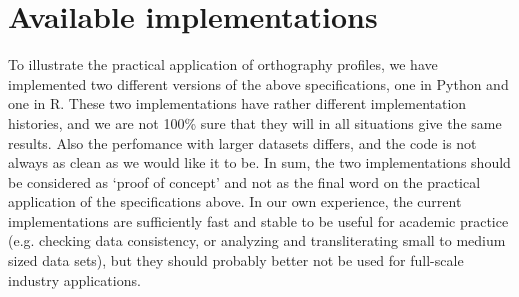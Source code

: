 \documentclass[output=inprep,
		biblatex
		]{LSP/langsci}\usepackage[]{graphicx}\usepackage[]{color}
\begin{document}
\maketitle
\frontmatter
% 
% 
% 
\tableofcontents
\mainmatter%














\section{Available implementations}
\label{implementations}

To illustrate the practical application of orthography profiles, we have
implemented two different versions of the above specifications, one in Python
and one in R. These two implementations have rather different implementation
histories, and we are not 100\% sure that they will in all situations give the
same results. Also the perfomance with larger datasets differs, and the code is
not always as clean as we would like it to be. In sum, the two implementations
should be considered as `proof of concept' and not as the final word on the
practical application of the specifications above. In our own experience, the
current implementations are sufficiently fast and stable to be useful for
academic practice (e.g. checking data consistency, or analyzing and
transliterating small to medium sized data sets), but they should probably
better not be used for full-scale industry applications.
\end{document}
